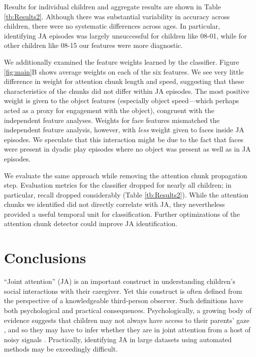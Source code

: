 \documentclass[10pt,letterpaper]{article}
\begin{document}
Results for individual children and aggregate results are shown in Table \ref{tb:Results2}. Although there was substantial variability in accuracy across children, there were no systematic differences across ages. In particular, identifying JA episodes was largely unsuccessful for children like 08-01, while for other children like 08-15 our features were more diagnostic. 

We additionally examined the feature weights learned by the classifier. Figure \ref{fig:main}B shows average weights on each of the six features. We see very little difference in weight for attention chunk length and speed, suggesting that these characteristics of the chunks did not differ within JA episodes. The most positive weight is given to the object features (especially object speed---which perhaps acted as a proxy for engagement with the object), congruent with the independent feature analyses. Weights for face features mismatched the independent feature analysis, however, with \emph{less} weight given to faces inside JA episodes. We speculate that this interaction might be due to the fact that faces were present in dyadic play episodes where no object was present as well as in JA episodes.

We evaluate the same approach while removing the attention chunk propagation step. Evaluation metrics for the classifier dropped for nearly all children; in particular, recall dropped considerably (Table \ref{tb:Results2}). While the attention chunks we identified did not directly correlate with JA, they nevertheless provided a useful temporal unit for classification. Further optimizations of the attention chunk detector could improve JA identification.

\section{Conclusions}

``Joint attention'' (JA) is an important construct in understanding children's social interactions with their caregiver. Yet this construct is often defined from the perspective of a knowledgeable third-person observer. Such definitions have both psychological and practical consequences. Psychologically, a growing body of evidence suggests that children may not always have access to their parents' gaze \cite{franchak2011,yu2013,frank2013}, and so they may have to infer whether they are in joint attention from a host of noisy signals \cite{frank2013b}. Practically, identifying JA in large datasets using automated methods may be exceedingly difficult. 
\end{document}
